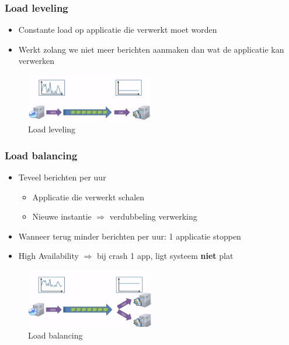 \documentclass{article}
\newcommand{\bold}[1]{\textbf{#1}}
\begin{document}
\subsubsection{Load leveling}

\begin{itemize}
    \item Constante load op applicatie die verwerkt moet worden
    \item Werkt zolang we niet meer berichten aanmaken dan wat de applicatie kan verwerken
\end{itemize}

\begin{figure}[H]
    \centering
    \includegraphics[width=0.5\textwidth]{load-leveling.png}
    \caption{Load leveling}
\end{figure}

\subsubsection{Load balancing}

\begin{itemize}
    \item Teveel berichten per uur
    \begin{itemize}
        \item Applicatie die verwerkt schalen
        \item Nieuwe instantie $\Rightarrow$ verdubbeling verwerking
    \end{itemize}
    \item Wanneer terug minder berichten per uur: 1 applicatie stoppen
    \item High Availability $\Rightarrow$ bij crash 1 app, ligt systeem \bold{niet} plat
\end{itemize}

\begin{figure}[H]
    \centering
    \includegraphics[width=0.5\textwidth]{load-balancing.png}
    \caption{Load balancing}
\end{figure}
\end{document}
